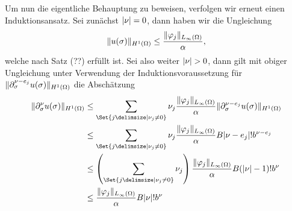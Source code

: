 \begin{Satz}
\begin{Beweis}
        Um nun die eigentliche Behauptung zu beweisen, verfolgen wir erneut einen Induktionsansatz.
        Sei zunächst $\lvert\nu\rvert = 0$, dann haben wir die Ungleichung
        \begin{equation}
            \lVert u(\sigma)\rVert_{H^{1}(\Omega)} \leq \frac{\lVert\varphi_{j}\rVert_{L_{\infty}(\Omega)}}{\alpha},
        \end{equation}
        welche nach Satz (??) erfüllt ist.
        Sei also weiter $\lvert\nu\rvert > 0$, dann gilt mit obiger Ungleichung unter Verwendung der Induktionsvoraussetzung für $\lVert\partial^{\nu - e_{j}}_{\sigma} u(\sigma)\rVert_{H^{1}(\Omega)}$ die Abschätzung
        \begin{align}
            \norm{\partial^{\nu}_{\sigma} u(\sigma)}_{H^{1}(\Omega)}
            &\leq
            \sum_{\Set{j \given \nu_{j} \neq 0}} \nu_{j} \frac{\norm{\varphi_{j}}_{L_{\infty}(\Omega)}}{\alpha} \norm{\partial^{\nu - e_{j}}_{\sigma} u(\sigma)}_{H^{1}(\Omega)}
            \\&\leq
            \sum_{\Set{j \given \nu_{j} \neq 0}} \nu_{j} \frac{\norm{\varphi_{j}}_{L_{\infty}(\Omega)}}{\alpha} B \abs{\nu - e_{j}}! b^{\nu - e_{j}}
            \\&\leq
            \left( \sum_{\Set{j \given \nu_{j} \neq 0}} \nu_{j} \right)  \frac{\norm{\varphi_{j}}_{L_{\infty}(\Omega)}}{\alpha} B (\abs{\nu} - 1)! b^{\nu}
            \\&\leq
            \frac{\norm{\varphi_{j}}_{L_{\infty}(\Omega)}}{\alpha} B \abs{\nu}! b^{\nu}
        \end{align}
    \end{Beweis}
\end{Satz}






